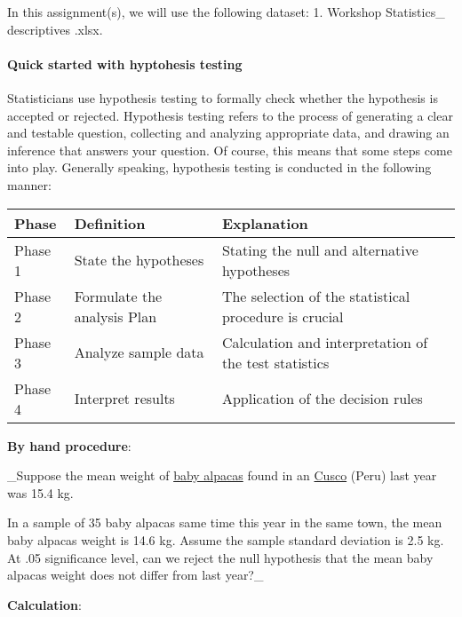 \documentclass[
]{article}
\begin{document}
In this assignment(s), we will use the following dataset: 1. Workshop
Statistics\_ descriptives .xlsx.

\hypertarget{quick-started-with-hyptohesis-testing}{%
\paragraph{Quick started with hyptohesis
testing}\label{quick-started-with-hyptohesis-testing}}

Statisticians use hypothesis testing to formally check whether the
hypothesis is accepted or rejected. Hypothesis testing refers to the
process of generating a clear and testable question, collecting and
analyzing appropriate data, and drawing an inference that answers your
question. Of course, this means that some steps come into play.
Generally speaking, hypothesis testing is conducted in the following
manner:

\begin{longtable}[]{@{}
  >{\raggedright\arraybackslash}p{}
  >{\raggedright\arraybackslash}p{}
  >{\raggedright\arraybackslash}p{}@{}}
\toprule
Phase & Definition & Explanation \\
\midrule
\endhead
Phase 1 & State the hypotheses & Stating the null and alternative
hypotheses \\
Phase 2 & Formulate the analysis Plan & The selection of the statistical
procedure is crucial \\
Phase 3 & Analyze sample data & Calculation and interpretation of the
test statistics \\
Phase 4 & Interpret results & Application of the decision rules \\
\bottomrule
\end{longtable}

\textbf{By hand procedure}:

\_Suppose the mean weight of
\href{https://en.wikipedia.org/wiki/Alpaca}{baby alpacas} found in an
\href{https://en.wikipedia.org/wiki/Cusco}{Cusco} (Peru) last year was
15.4 kg.

In a sample of 35 baby alpacas same time this year in the same town, the
mean baby alpacas weight is 14.6 kg. Assume the sample standard
deviation is 2.5 kg. At .05 significance level, can we reject the null
hypothesis that the mean baby alpacas weight does not differ from last
year?\_

\textbf{Calculation}:
\end{document}
